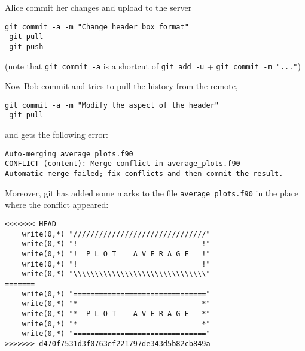 \documentclass[a4paper,10pt]{article}
\begin{document}
Alice commit her changes and upload to the server

\begin{lstlisting}[style=Alice]
 git commit -a -m "Change header box format"
 git pull
 git push
\end{lstlisting}
(note that \texttt{git commit -a} is a shortcut of \texttt{git add -u} + \texttt{git commit -m "..."})

Now Bob commit and tries to pull the history from the remote,

\begin{lstlisting}[style=Bob]
 git commit -a -m "Modify the aspect of the header"
 git pull
\end{lstlisting}
and gets the following error:

\begin{lstlisting}[style=Output]
Auto-merging average_plots.f90
CONFLICT (content): Merge conflict in average_plots.f90
Automatic merge failed; fix conflicts and then commit the result.
\end{lstlisting}

Moreover, git has added some marks to the file \texttt{average\_plots.f90} in the place where the conflict appeared:

\begin{lstlisting}[style=Text]
<<<<<<< HEAD
    write(0,*) "///////////////////////////////"
    write(0,*) "!                             !"
    write(0,*) "!  P L O T    A V E R A G E   !"
    write(0,*) "!                             !"
    write(0,*) "\\\\\\\\\\\\\\\\\\\\\\\\\\\\\\\"
=======
    write(0,*) "==============================="
    write(0,*) "*                             *"
    write(0,*) "*  P L O T    A V E R A G E   *"
    write(0,*) "*                             *"
    write(0,*) "==============================="
>>>>>>> d470f7531d3f0763ef221797de343d5b82cb849a
\end{lstlisting}
\end{document}
